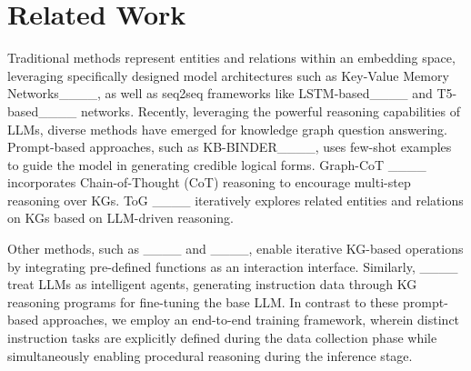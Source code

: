 \section{Related Work}
Traditional methods represent entities and relations within an embedding space, leveraging specifically designed model architectures such as Key-Value Memory Networks____, as well as seq2seq frameworks like LSTM-based____ and T5-based____ networks. Recently, leveraging the powerful reasoning capabilities of LLMs, diverse methods have emerged for knowledge graph question answering. Prompt-based approaches, such as KB-BINDER____, uses few-shot examples to guide the model in generating credible logical forms. Graph-CoT ____ incorporates Chain-of-Thought (CoT) reasoning to encourage multi-step reasoning over KGs. ToG ____ iteratively explores related entities and relations on KGs based on LLM-driven reasoning.

Other methods, such as ____ and ____, enable iterative KG-based operations by integrating pre-defined functions as an interaction interface. Similarly, ____ treat LLMs as intelligent agents, generating instruction data through KG reasoning programs for fine-tuning the base LLM. In contrast to these prompt-based approaches, we employ an end-to-end training framework, wherein distinct instruction tasks are explicitly defined during the data collection phase while simultaneously enabling procedural reasoning during the inference stage. 

